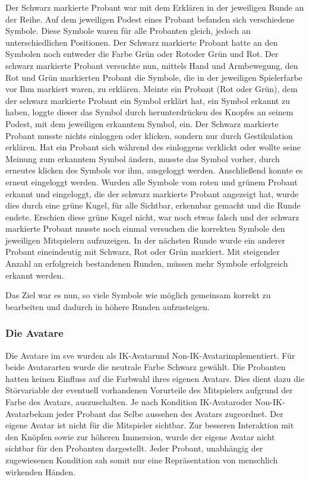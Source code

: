 \documentclass[a4paper,11pt]{article}%
\renewcommand{\\}{\vspace*{0.5\baselineskip} \newline}
\begin{document}
Der Schwarz markierte Probant war mit dem Erklären in der jeweiligen Runde an der Reihe.
Auf dem jeweiligen Podest eines Probant befanden sich verschiedene Symbole. Diese Symbole waren für alle Probanten gleich, jedoch an unterschiedlichen Positionen. Der Schwarz markierte Probant hatte an den Symbolen noch entweder die Farbe \flqq Grün oder Rot\frqq oder \flqq Grün und Rot\frqq.
Der schwarz markierte Probant versuchte nun, mittels Hand und Armbewegung, den Rot und Grün markierten Probant die Symbole, die in der jeweiligen Spielerfarbe vor Ihm markiert waren, zu erklären.
Meinte ein Probant (Rot oder Grün), dem der schwarz markierte Probant ein Symbol erklärt hat, ein Symbol erkannt zu haben, loggte dieser das Symbol durch herunterdrücken des Knopfes an seinem Podest, mit dem jeweiligen erkanntem Symbol, ein. Der Schwarz markierte Probant musste nichts einloggen oder klicken, sondern nur durch Gestikulation erklären.
Hat ein Probant sich während des einloggens verklickt oder wollte seine Meinung zum erkanntem Symbol ändern, musste das Symbol vorher, durch erneutes klicken des Symbols vor ihm, ausgeloggt werden. Anschließend konnte es erneut eingeloggt werden.
Wurden alle Symbole vom roten und grünem Probant erkannt und eingeloggt, die der schwarz markierte Probant angezeigt hat, wurde dies durch eine grüne Kugel, für alle Sichtbar, erkennbar gemacht und die Runde endete. Erschien diese grüne Kugel nicht, war noch etwas falsch und der schwarz markierte Probant musste noch einmal versuchen die korrekten Symbole den jeweiligen Mitspielern aufzuzeigen.
In der nächsten Runde wurde ein anderer Probant eineindeutig mit Schwarz, Rot oder Grün markiert.
Mit steigender Anzahl an erfolgreich bestandenen Runden, müssen mehr Symbole erfolgreich erkannt werden.

Das Ziel war es nun, so viele Symbole wie möglich gemeinsam korrekt zu bearbeiten und dadurch in höhere Runden aufzusteigen.

	\subsubsection{Die Avatare}
Die Avatare im \ac{sve} wurden als \flqq IK-Avatar\frqq und \flqq Non-IK-Avatar\frqq implementiert.
Für beide Avatararten wurde die neutrale Farbe Schwarz gewählt. Die Probanten hatten keinen Einfluss auf die Farbwahl ihres eigenen Avatars. Dies dient dazu die Störvariable der eventuell vorhandenen Vorurteile des Mitspielers aufgrund der Farbe des Avatars, auszuschalten. Je nach Kondition \flqq IK-Avatar\frqq oder \flqq Non-IK-Avatar\frqq bekam jeder Probant das Selbe aussehen des Avatars zugeordnet. Der eigene Avatar ist nicht für die Mitspieler sichtbar. Zur besseren Interaktion mit den Knöpfen sowie zur höheren Immersion, wurde der eigene Avatar nicht sichtbar für den Probanten dargestellt. Jeder Probant, unabhängig der zugewiesenen Kondition sah somit nur eine Repräsentation von menschlich wirkenden Händen.
\end{document}
